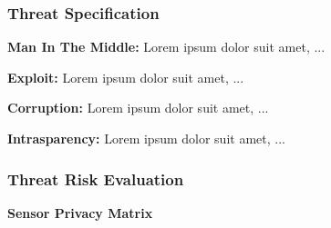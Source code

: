 \subsubsection{Threat Specification}

\textbf{Man In The Middle:}
Lorem ipsum dolor suit amet, ...

\textbf{Exploit:}
Lorem ipsum dolor suit amet, ...

\textbf{Corruption:}
Lorem ipsum dolor suit amet, ...

\textbf{Intrasparency:}
Lorem ipsum dolor suit amet, ...







\subsubsection{Threat Risk Evaluation}


\textbf{Sensor Privacy Matrix}



